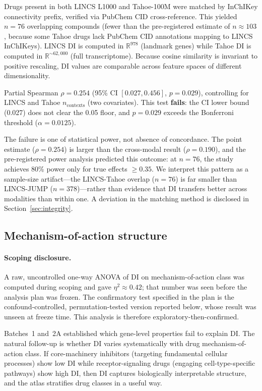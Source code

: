 \documentclass[11pt]{article}
\begin{document}
Drugs present in both LINCS L1000 and Tahoe-100M were matched by
InChIKey connectivity prefix, verified via PubChem CID cross-reference.
This yielded $n = 76$ overlapping compounds (fewer than the
pre-registered estimate of $n \approx 103$, because some Tahoe drugs
lack PubChem CID annotations mapping to LINCS InChIKeys).  LINCS DI is
computed in $\mathbb{R}^{978}$ (landmark genes) while Tahoe DI is
computed in $\mathbb{R}^{\sim 62{,}000}$ (full transcriptome).  Because
cosine similarity is invariant to positive rescaling, DI values are
comparable across feature spaces of different dimensionality.

Partial Spearman $\rho = 0.254$ (95\% CI $[0.027, 0.456]$,
$p = 0.029$), controlling for LINCS and Tahoe $n_{\mathrm{contexts}}$
(two covariates).  This test \textbf{fails}: the CI lower bound
(0.027) does not clear the 0.05 floor, and $p = 0.029$ exceeds the
Bonferroni threshold ($\alpha = 0.0125$).

The failure is one of statistical power, not absence of concordance.
The point estimate ($\rho = 0.254$) is larger than the cross-modal result
($\rho = 0.190$), and the pre-registered power analysis predicted this
outcome: at $n = 76$, the study achieves 80\% power only for true
effects $\geq 0.35$.  We interpret this pattern as a sample-size
artifact---the LINCS-Tahoe overlap ($n = 76$) is far smaller than
LINCS-JUMP ($n = 378$)---rather than evidence that DI transfers better
across modalities than within one.  A deviation in the matching method
is disclosed in Section~\ref{sec:integrity}.

\subsection{Mechanism-of-action structure}
\label{sec:moa}

\paragraph{Scoping disclosure.}
A raw, uncontrolled one-way ANOVA of DI on mechanism-of-action class was computed
during scoping and gave $\eta^2 \approx 0.42$; that number was seen before the
analysis plan was frozen.  The confirmatory test specified in the plan is the
confound-controlled, permutation-tested version reported below, whose result was
unseen at freeze time.  This analysis is therefore exploratory-then-confirmed.

Batches~1 and~2A established which gene-level properties fail to explain DI.
The natural follow-up is whether DI varies systematically with drug
mechanism-of-action class.  If core-machinery inhibitors (targeting
fundamental cellular processes) show low DI while receptor-signaling
drugs (engaging cell-type-specific pathways) show high DI, then DI
captures biologically interpretable structure, and the atlas stratifies
drug classes in a useful way.
\end{document}
